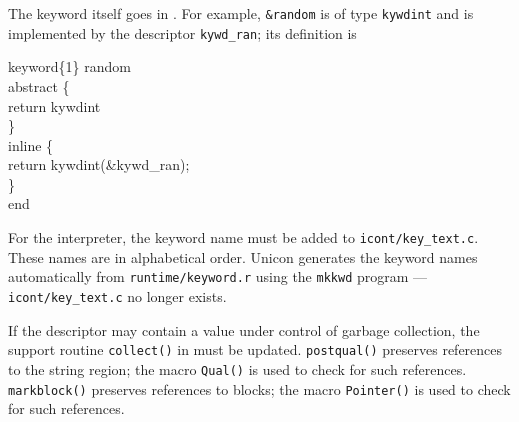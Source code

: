 The keyword itself goes in . For example,
\texttt{\&random} is of type \texttt{kywdint} and is implemented by the descriptor
\texttt{kywd\_ran}; its definition is
\begin{iconcode}
keyword\{1\} random\\
\>abstract \{\\
\>\>return kywdint\\
\>\}\\
\>inline \{\\
\>\>return kywdint(\&kywd\_ran);\\
\>\}\\
end
\end{iconcode}
\noindent
For the interpreter, the keyword name must be added to
\texttt{icont/key\_text.c}. These names are in alphabetical order.
{\color{blue} Unicon generates the keyword names automatically
from \texttt{runtime/keyword.r} using the \texttt{mkkwd} program
--- \texttt{icont/key\_text.c} no longer exists.}

If the descriptor may contain a value under control of garbage collection,
the support routine \texttt{collect()} in  must be
updated. \texttt{postqual()} preserves references to the string region;
the macro \texttt{Qual()} is used to check for such references.
\texttt{markblock()} preserves references to blocks; the macro \texttt{Pointer()}
is used to check for such references.

\clearpage
\newpage
